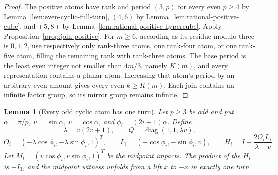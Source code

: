 \documentclass[11pt,a4paper]{article}
\theoremstyle{plain}
\newtheorem{lemma}[theorem]{Lemma}
\theoremstyle{definition}
\theoremstyle{remark}
\begin{document}
\begin{proof}
The positive atoms have rank and period $(3,p)$ for every even $p\ge4$ by
Lemma~\ref{lem:even-cyclic-full-turn}, $(4,6)$ by
Lemma~\ref{lem:rational-positive-cube}, and $(5,8)$ by
Lemma~\ref{lem:rational-positive-hypercube}.  Apply
Proposition~\ref{prop:join-positive}.  For $m\ge6$, according as its residue
modulo three is $0,1,2$, use respectively only rank-three atoms, one rank-four
atom, or one rank-five atom, filling the remaining rank with rank-three atoms.
The base period is the least even integer not smaller than $4m/3$, namely
$K(m)$, and every representation contains a planar atom.  Increasing that
atom's period by an arbitrary even amount gives every even $k\ge K(m)$.  Each
join contains an infinite factor group, so its mirror group remains infinite.
\end{proof}



\begin{lemma}[Every odd cyclic atom has one turn]
\label{lem:odd-cyclic-one-turn}
Let $p\ge3$ be odd and put $\alpha=\pi/p$, $u=\sin\alpha$,
$v=\cos\alpha$, and $\phi_i=(2i+1)\alpha$. Define
\[
 \lambda=v(2v+1),\qquad Q=\operatorname{diag}(1,1,\lambda v),
\]
\[
 O_i=(-\lambda\cos\phi_i,-\lambda\sin\phi_i,1)^T,\qquad
 L_i=(-\cos\phi_i,-\sin\phi_i,v),\qquad
 H_i=I-\frac{2O_iL_i}{\lambda+v}.
\]
Let $M_i=(v\cos\phi_i,v\sin\phi_i,1)^T$ be the midpoint impacts. The product
of the $H_i$ is $-I_3$, and the midpoint witness unfolds from a lift $x$ to $-x$
in exactly one turn.
\end{lemma}
\end{document}
